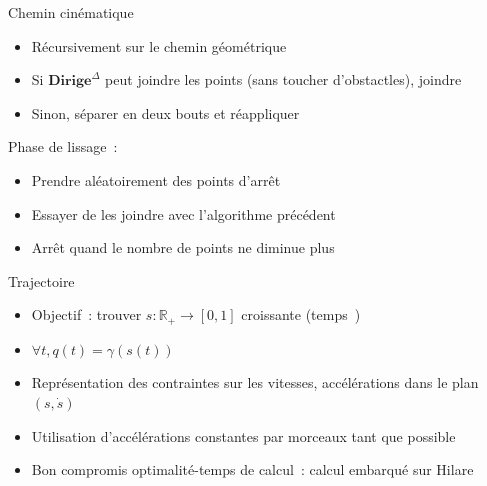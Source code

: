 \documentclass[11pt]{beamer}
\newcommand{\steer}{\textbf{Dirige}}
\newcommand{\steerflat}{\steer^\Delta}
\begin{document}
\begin{frame}{Chemin cinématique}
	\begin{itemize}
		\item Récursivement sur le chemin géométrique
		\item Si $\steerflat$ peut joindre les points (sans toucher
			d'obstactles), joindre
		\item Sinon, séparer en deux bouts et réappliquer
	\end{itemize}

	\vspace{1em}

	Phase de lissage~:

	\begin{itemize}
		\item Prendre aléatoirement des points d'arrêt
		\item Essayer de les joindre avec l'algorithme précédent
		\item Arrêt quand le nombre de points ne diminue plus
	\end{itemize}
\end{frame}

\begin{frame}{Trajectoire}
	\begin{itemize}
		\item Objectif~: trouver $s : \mathbb{R}_+ \to [0, 1]$ croissante
			(\og{}temps~\fg)
		\item $\forall t, q(t) = \gamma(s(t))$
		\item Représentation des contraintes sur les vitesses, accélérations
			dans le plan $(s, \dot{s})$
		\item Utilisation d'accélérations constantes par morceaux \og{}tant que
			possible~\fg{}
		\item Bon compromis optimalité-temps de calcul~: calcul embarqué sur
			Hilare
	\end{itemize}
\end{frame}
\end{document}
